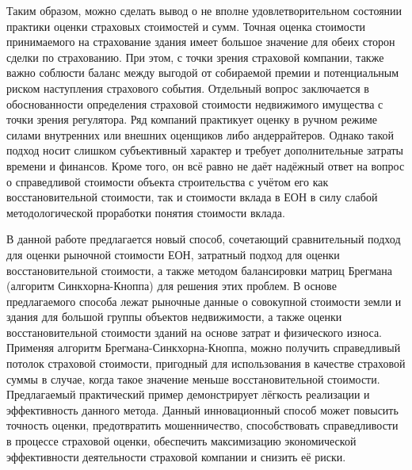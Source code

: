 \documentclass[12pt]{scrartcl}
\begin{document}
Таким образом, можно сделать вывод о не вполне удовлетворительном состоянии практики оценки страховых стоимостей и сумм. Точная оценка стоимости принимаемого на страхование здания имеет большое значение для обеих сторон сделки по страхованию. При этом, с точки зрения страховой компании, также важно соблюсти баланс между выгодой от собираемой премии и потенциальным риском наступления страхового события. Отдельный вопрос заключается в обоснованности определения страховой стоимости недвижимого имущества с точки зрения регулятора. Ряд компаний практикует оценку в ручном режиме силами внутренних или внешних оценщиков либо андеррайтеров. Однако такой подход носит слишком субъективный характер и требует дополнительные затраты времени и финансов. Кроме того, он всё равно не даёт надёжный ответ на вопрос о справедливой стоимости объекта строительства с учётом его как восстановительной стоимости, так и стоимости вклада в ЕОН в силу слабой методологической проработки понятия стоимости вклада.

В данной работе предлагается новый способ, сочетающий сравнительный подход для оценки рыночной стоимости ЕОН, затратный подход для оценки восстановительной стоимости, а также методом балансировки матриц Брегмана (алгоритм Синкхорна-Кноппа) для решения этих проблем. В основе предлагаемого способа лежат рыночные данные о совокупной стоимости земли и здания для большой группы объектов недвижимости, а также оценки восстановительной стоимости зданий на основе затрат и физического износа. Применяя алгоритм Брегмана-Синкхорна-Кноппа, можно получить справедливый потолок страховой стоимости, пригодный для использования в качестве страховой суммы в случае, когда такое значение меньше восстановительной стоимости. Предлагаемый практический пример демонстрирует лёгкость реализации и эффективность данного метода. Данный инновационный способ может повысить точность оценки, предотвратить мошенничество, способствовать справедливости в процессе страховой оценки, обеспечить максимизацию экономической эффективности деятельности страховой компании и снизить её риски.
\end{document}
